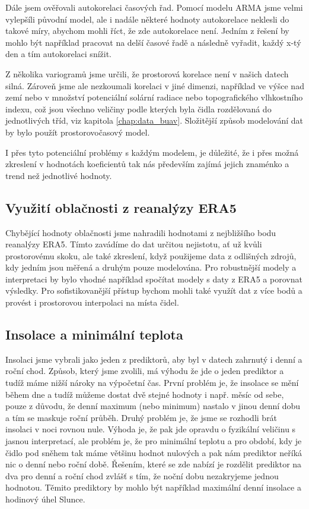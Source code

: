Dále jsem ověřovali autokorelaci časových řad. Pomocí modelu ARMA jsme velmi vylepšíli původní model, ale i nadále některé hodnoty autokorelace neklesli do takové míry, abychom mohli říct, že zde autokorelace není. Jedním z řešení by mohlo být například pracovat na delší časové řadě a následně vyřadit, každý x-tý den a tím autokorelaci snížit. 

Z několika variogramů jsme určili, že prostorová korelace není v našich datech silná. Zároveň jsme ale nezkoumali korelaci v jiné dimenzi, například ve výšce nad zemí nebo v množství potenciální solární radiace nebo topografického vlhkostního indexu, což jsou všechno veličiny podle kterých byla čidla rozdělovaná do jednotlivých tříd, viz kapitola \ref{chap:data_buav}. Složitější způsob modelování dat by bylo použít prostorovočasový model.

I přes tyto potenciální problémy s každým modelem, je důležité, že i přes možná zkreslení v hodnotách koeficientů tak nás především zajímá jejich znaménko a trend než jednotlivé hodnoty.

\subsection{Využití oblačnosti z reanalýzy ERA5}\label{chap:disc_era5}
Chybějící hodnoty oblačnosti jsme nahradili hodnotami z nejbližšího bodu reanalýzy ERA5. Tímto zavádíme do dat určitou nejistotu, ať už kvůli prostorovému skoku, ale také zkreslení, když použijeme data z odlišných zdrojů, kdy jedním jsou měřená a druhým pouze modelována. Pro robustnější modely a interpretaci by bylo vhodné například spočítat modely s daty z ERA5 a porovnat výsledky. Pro sofistikovanější přístup bychom mohli také využít dat z více bodů a provést i prostorovou interpolaci na místa čidel.

\subsection{Insolace a minimální teplota}\label{chap:mintemp_insolation}
Insolaci jsme vybrali jako jeden z prediktorů, aby byl v datech zahrnutý i denní a roční chod. Způsob, který jsme zvolili, má výhodu že jde o jeden prediktor a tudíž máme nižší nároky na výpočetní čas. První problém je, že insolace se mění během dne a tudíž můžeme dostat dvě stejné hodnoty i např. měsíc od sebe, pouze z důvodu, že denní maximum (nebo minimum) nastalo v jinou denní dobu a tím se maskuje roční průběh. Druhý problém je, že jsme se rozhodli brát insolaci v noci rovnou nule. Výhoda je, že pak jde opravdu o fyzikální veličinu s jasnou interpretací, ale problém je, že pro minimální teplotu a pro období, kdy je čidlo pod sněhem tak máme většinu hodnot nulových a pak nám prediktor neříká nic o denní nebo roční době. Řešením, které se zde nabízí je rozdělit prediktor na dva pro denní a roční chod zvlášť s tím, že noční dobu nezakryjeme jednou hodnotou. Těmito prediktory by mohlo být například maximální denní insolace a hodinový úhel Slunce.
